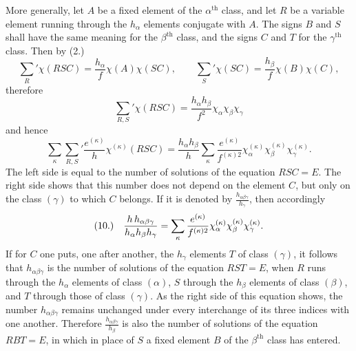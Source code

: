\documentclass[11pt]{article}
\makeatletter
\newcommand{\frobtagc}[2]{\[\begin{array}{@{}r@{\quad}c@{}}\textup{(#1)} & \displaystyle #2\end{array}\]}
\makeatother
\begin{document}
More generally, let $A$ be a fixed element of the $\alpha^{\mathrm{th}}$ class, and let $R$ be a variable element running through the $h_\alpha$ elements conjugate with $A$. The signs $B$ and $S$ shall have the same meaning for the $\beta^{\mathrm{th}}$ class, and the signs $C$ and $T$ for the $\gamma^{\mathrm{th}}$ class. Then by (2.)
\[
\sum_R'\chi(RSC)=\frac{h_\alpha}{f}\chi(A)\chi(SC),\qquad \sum_S'\chi(SC)=\frac{h_\beta}{f}\chi(B)\chi(C),
\]
therefore
\[
\sum_{R,S}'\chi(RSC)=\frac{h_\alpha h_\beta}{f^2}\chi_\alpha\chi_\beta\chi_\gamma
\]
and hence
\[
\sum_\kappa\sum_{R,S}'\frac{e^{(\kappa)}}{h}\chi^{(\kappa)}(RSC)=\frac{h_\alpha h_\beta}{h}\sum_\kappa\frac{e^{(\kappa)}}{f^{(\kappa)2}}\chi_\alpha^{(\kappa)}\chi_\beta^{(\kappa)}\chi_\gamma^{(\kappa)}.
\]
The left side is equal to the number of solutions of the equation $RSC=E$. The right side shows that this number does not depend on the element $C$, but only on the class $(\gamma)$ to which $C$ belongs. If it is denoted by $\frac{h_{\alpha\beta\gamma}}{h_\gamma}$, then accordingly
\frobtagc{10.}{\frac{h\,h_{\alpha\beta\gamma}}{h_\alpha h_\beta h_\gamma}=\sum_\kappa\frac{e^{(\kappa)}}{f^{(\kappa)2}}\chi_\alpha^{(\kappa)}\chi_\beta^{(\kappa)}\chi_\gamma^{(\kappa)}.}
If for $C$ one puts, one after another, the $h_\gamma$ elements $T$ of class $(\gamma)$, it follows that $h_{\alpha\beta\gamma}$ is the number of solutions of the equation $RST=E$, when $R$ runs through the $h_\alpha$ elements of class $(\alpha)$, $S$ through the $h_\beta$ elements of class $(\beta)$, and $T$ through those of class $(\gamma)$. As the right side of this equation shows, the number $h_{\alpha\beta\gamma}$ remains unchanged under every interchange of its three indices with one another. Therefore $\frac{h_{\alpha\beta\gamma}}{h_\beta}$ is also the number of solutions of the equation $RBT=E$, in which in place of $S$ a fixed element $B$ of the $\beta^{\mathrm{th}}$ class has entered.
\end{document}
